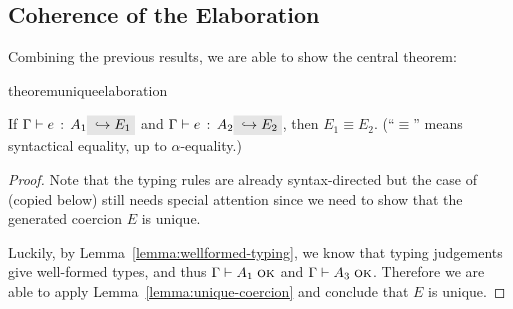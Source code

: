 


\subsection{Coherence of the Elaboration}
Combining the previous results, we are able to show the central theorem:

\begin{restatable}{theorem}{uniqueelaboration}
  \label{theorem:unique-elaboration}

  If $\jtype \Gamma e {A_1} \yields {E_1}$ and $\jtype \Gamma e {A_2} \yields
  {E_2}$, then $E_1 \equiv E_2$. (``$\equiv$'' means syntactical equality, up to
  $\alpha$-equality.)

\end{restatable}

\begin{proof}
  Note that the typing rules are already syntax-directed but the case of
   (copied below) still needs special attention since we
  need to show that the generated coercion $E$ is unique.
  \begin{mathpar}
  \end{mathpar}
  Luckily, by Lemma~\ref{lemma:wellformed-typing}, we know that typing
  judgements give well-formed types, and thus $\jwf \Gamma {A_1}$ and $\jwf
  \Gamma {A_3}$. Therefore we are able to apply
  Lemma~\ref{lemma:unique-coercion} and conclude that $E$ is unique.

\end{proof}
